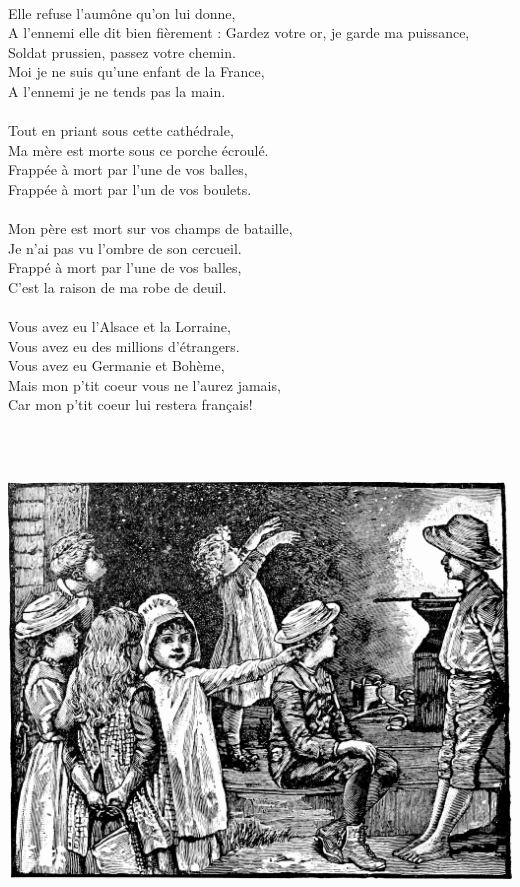 \\Elle refuse l'aumône qu'on lui donne,
\\A l'ennemi elle dit bien fièrement : \bissimple
\breakpage
Gardez votre or, je garde ma puissance,
\\Soldat prussien, passez votre chemin.
\\Moi je ne suis qu'une enfant de la France,
\\A l'ennemi je ne tends pas la main. \bissimple
\\\\Tout en priant sous cette cathédrale,
\\Ma mère est morte sous ce porche écroulé.
\\Frappée à mort par l'une de vos balles,
\\Frappée à mort par l'un de vos boulets. \bissimple
\\\\Mon père est mort sur vos champs de bataille,
\\Je n'ai pas vu l'ombre de son cercueil.
\\Frappé à mort par l'une de vos balles,
\\C'est la raison de ma robe de deuil. \bissimple
\\\\Vous avez eu l'Alsace et la Lorraine,
\\Vous avez eu des millions d'étrangers.
\\Vous avez eu Germanie et Bohème,
\\Mais mon p'tit coeur vous ne l'aurez jamais,
\\Car mon p'tit coeur lui restera français!

\\\\
\bigskip
\begin{center}
   \includegraphics[width=1\textwidth]{images/brev30.png}
 \end{center}

\breakpage